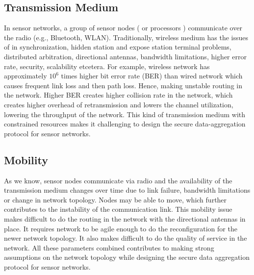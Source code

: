 	\subsection{Transmission Medium}
		In sensor networks, a group of sensor nodes ( or processors ) communicate over the radio (e.g., Bluetooth, WLAN).
		Traditionally, wireless medium has the issues of in synchronization, hidden station and expose station terminal problems, distributed arbitration, directional antennas, bandwidth limitations, higher error rate, security, scalability etcetera.
		For example, wireless network has approximately $10^6$ times higher bit error rate (BER) than wired network which causes frequent link loss and then path loss. 
		Hence, making unstable routing in the network.
		Higher BER creates higher collision rate in the network, which creates higher overhead of retransmission and lowers the channel utilization, lowering the throughput of the network.
		This kind of transmission medium with constrained resources makes it challenging to design the secure data-aggregation protocol for sensor networks.

	\subsection{Mobility}
		As we know, sensor nodes communicate via radio and the availability of the transmission medium changes over time due to link failure, bandwidth limitations or change in network topology.
		Nodes may be able to move, which further contributes to the instability of the communication link.
		This mobility issue makes difficult to do the routing in the network with the directional antennas in place.
		It requires network to be agile enough to do the reconfiguration for the newer network topology.
		It also makes difficult to do the quality of service in the network. 
		All these parameters combined contributes to making strong assumptions on the network topology while designing the secure data aggregation protocol for sensor networks.

